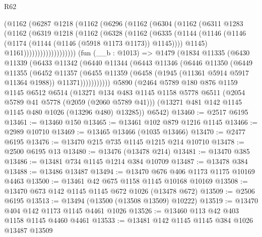 \begin{lexlean}{R62}
\begin{coremodule}
              (@1162
                (@6287
                  @1218
                  (@1162
                    (@6296
                      (@1162
                        (@6304
                          (@1162
                            (@6311
                              @1283
                              (@1162
                                (@6319
                                  @1218
                                  (@1162
                                    (@6328
                                      (@1162
                                        (@6335
                                          (@1144
                                            (@1146
                                              (@1146
                                                (@1174 (@1144 (@1146 (@5918 @1173 @1173)) @1145))))
                                            @1145)
                                          @1161)))))))))))))))))))
    (fun (__b : @1013) =>
    @1479
      (@1834
        @11335
        (@6430
          @11339
          (@6433
            @11342
            (@6440
              @11344
              (@6443
                @11346
                (@6446
                  @11350
                  (@6449
                    @11355
                    (@6452
                      @11357
                      (@6455
                        @11359
                        (@6458 (@1945 (@11361 @5914 @5917 @11364 @1988)) @11371)))))))))))
    @5890
    (@2464
      @5789
      @180
      @876
      @1159
      @1145
      @6512
      @6514
      (@13271
        @134
        @483
        @1145
        @1158
        @5778
        @6511
        (@2054 @5789 @41 @5778 (@2059 (@2060 @5789 @41)))
        (@13271 @481 @142 @1145 @1145 @480 @1026 (@13296 @480) @13285))
      @6542)
@13460 := @2517 @6195
@13461 := @13460 @150
@13465 := @13461 @102 @879 @1216 @1145
@13466 := @2989 @10710
@13469 := @13465 @13466 (@1035 @13466)
@13470 := @2477 @6195
@13476 := @13470 @215 @735 @1145 @1215 @214 @10710
@13478 := @2500 @6195 @13
@13480 := @13476 (@13478 @214)
@13481 := @13470 @385
@13486 := @13481 @734 @1145 @1214 @384 @10709
@13487 := @13478 @384
@13488 := @13486 @13487
@13494 := @13470 @676 @406 @1173 @1175 @10169 @4463
@13500 := @13461 @42 @675 @1158 @1145 @10168 @10169
@13508 := @13470 @673 @142 @1145 @1145 @672 @1026 (@13478 @672)
@13509 := @2506 @6195
@13513 := @13494 (@13500 (@13508 @13509) @10222)
@13519 := @13470 @404 @142 @1173 @1145 @4461 @1026
@13526 := @13460 @113 @42 @403 @1158 @1145 @4460 @4461
@13533 := @13481 @142 @1145 @1145 @384 @1026 @13487 @13509

\end{coremodule}
\end{lexlean}
